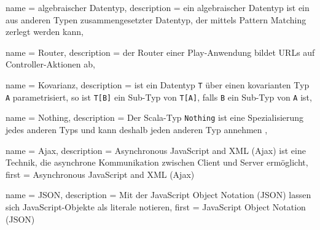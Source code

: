 






{
  name        = algebraischer Datentyp,
  description = {ein algebraischer Datentyp ist ein aus anderen Typen zusammengesetzter Datentyp, der mittels Pattern Matching zerlegt werden kann},
}


{
  name        = Router,
  description = {der Router einer Play-Anwendung bildet URLs auf Controller-Aktionen ab},
}


{
  name        = Kovarianz,
  description = {ist ein Datentyp \lstinline|T| über einen kovarianten Typ \lstinline|A| parametrisiert, so ist \lstinline|T[B]| ein Sub-Typ von \lstinline|T[A]|, falls \lstinline|B| ein Sub-Typ von \lstinline|A| ist},
}


{
  name        = Nothing,
  description = {Der Scala-Typ \lstinline|Nothing| ist eine Spezialisierung jedes anderen Typs und kann deshalb jeden anderen Typ annehmen \cite[vgl.][S.~216]{programming_in_scala}},
}


{
  name        = Ajax,
  description = {Asynchronous JavaScript and XML (Ajax) ist eine Technik, die asynchrone Kommunikation zwischen Client und Server ermöglicht},
  first       = {Asynchronous JavaScript and XML (Ajax)}
}


{
  name        = JSON,
  description = {Mit der JavaScript Object Notation (JSON) lassen sich JavaScript-Objekte als literale notieren},
  first       = {JavaScript Object Notation (JSON)}
}